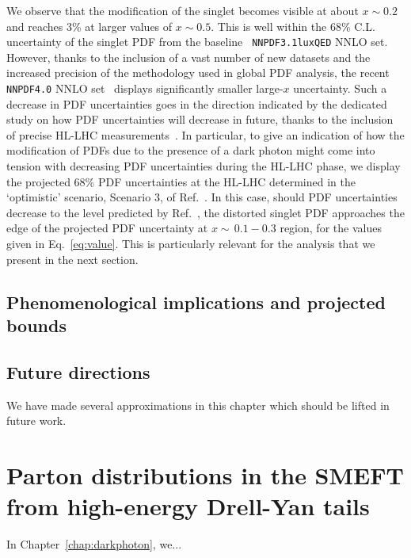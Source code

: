 \documentclass[withindex,glossary]{cam-thesis}
\begin{document}
We observe
that the modification of the singlet becomes visible at about $x\sim 0.2$ and
reaches 3\% at larger values of $x\sim 0.5$. This is well within the
68\% C.L. uncertainty of the singlet PDF from the baseline {\tt
  NNPDF3.1luxQED} NNLO set. However, thanks to the inclusion of a vast
number of new datasets and the increased precision of the methodology
used in global PDF analysis, the recent {\tt NNPDF4.0} NNLO
set~\cite{Ball:2021leu} 
displays significantly smaller large-$x$ uncertainty. Such a
decrease in PDF uncertainties goes in the direction indicated by the
dedicated study on how PDF
uncertainties will decrease in future, thanks to the inclusion of precise
HL-LHC measurements~\cite{Khalek:2018}. In particular, to give an indication
of how the modification of PDFs due to the presence of a dark photon might
come into tension with decreasing PDF uncertainties during the HL-LHC phase, 
we display the projected 68\% PDF uncertainties at
the HL-LHC determined in the `optimistic' scenario, Scenario 3, of Ref.~\cite{Khalek:2018}.
In this case, should PDF uncertainties decrease to the
level predicted by Ref.~\cite{Khalek:2018}, the distorted singlet PDF approaches the edge of the
projected PDF uncertainty at $x\sim \,0.1-0.3$ region, for the values given
in Eq.~\eqref{eq:value}. This is particularly relevant for the
analysis that we present in the next section. 




\newpage
\section{Phenomenological implications and projected bounds}
\label{sec:dark_pheno}



\newpage
\section{Future directions}
\label{sec:dark_future}

We have made several approximations in this chapter which should be lifted in future work.


 


\newpage
\chapter{Parton distributions in the SMEFT from high-energy Drell-Yan tails}
\label{chap:smeftdy}

In Chapter~\ref{chap:darkphoton}, we... 
\end{document}
